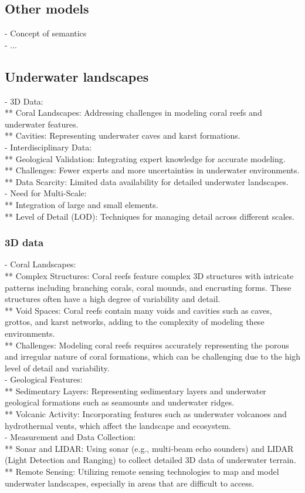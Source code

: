 \subsection{Other models}
- Concept of semantics \\
- ...

\subsection{Underwater landscapes}
- 3D Data: \\
** Coral Landscapes: Addressing challenges in modeling coral reefs and underwater features. \\
** Cavities: Representing underwater caves and karst formations. \\
- Interdisciplinary Data: \\
** Geological Validation: Integrating expert knowledge for accurate modeling. \\
** Challenges: Fewer experts and more uncertainties in underwater environments. \\
** Data Scarcity: Limited data availability for detailed underwater landscapes. \\
- Need for Multi-Scale: \\
** Integration of large and small elements. \\
** Level of Detail (LOD): Techniques for managing detail across different scales.

\subsubsection{3D data}
- Coral Landscapes: \\
** Complex Structures: Coral reefs feature complex 3D structures with intricate patterns including branching corals, coral mounds, and encrusting forms. These structures often have a high degree of variability and detail. \\
** Void Spaces: Coral reefs contain many voids and cavities such as caves, grottos, and karst networks, adding to the complexity of modeling these environments. \\
** Challenges: Modeling coral reefs requires accurately representing the porous and irregular nature of coral formations, which can be challenging due to the high level of detail and variability. \\
- Geological Features: \\
** Sedimentary Layers: Representing sedimentary layers and underwater geological formations such as seamounts and underwater ridges. \\
** Volcanic Activity: Incorporating features such as underwater volcanoes and hydrothermal vents, which affect the landscape and ecosystem. \\
- Measurement and Data Collection: \\
** Sonar and LIDAR: Using sonar (e.g., multi-beam echo sounders) and LIDAR (Light Detection and Ranging) to collect detailed 3D data of underwater terrain. \\
** Remote Sensing: Utilizing remote sensing technologies to map and model underwater landscapes, especially in areas that are difficult to access.

